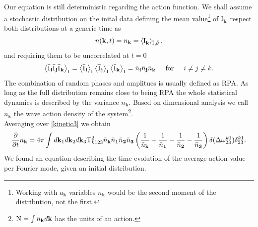 Our equation is still deterministic regarding the action function. We shall assume a stochastic distribution on the inital data defining 
the mean value\footnote{Working with $a_\mathbf{k}$ variables $n_\mathbf{k}$ would be the second moment of the distribution, not the first.}
of $\mathrm{I}^{}_\mathbf{k}$ respect both distributions at a generic time as 
\begin{equation}
    n(\mathbf{k},t) = n_\mathbf{k} = \left\langle \mathrm{I}^{}_\mathbf{k} \right\rangle_{\bar{\mathrm{I}^{}}, \bar{\theta}^{}},
    \label{wavdef}
\end{equation}     
and requiring them to be uncorrelated at $t=0$ \\
\begin{equation}
    \left\langle \bar{\mathrm{I}^{}}_\mathbf{i} \bar{\mathrm{I}^{}}_\mathbf{j} \bar{\mathrm{I}^{}}_\mathbf{k}\right\rangle_{\bar{\mathrm{I}^{}}} = 
    \left\langle\bar{\mathrm{I}^{}}_\mathbf{i} \right\rangle_{\bar{\mathrm{I}^{}}} \left\langle \bar{\mathrm{I}^{}}_\mathbf{j} \right\rangle_{\bar{\mathrm{I}^{}}} \left\langle \bar{\mathrm{I}^{}}_\mathbf{k} \right\rangle_{\bar{\mathrm{I}^{}}}
    = \bar{n}_\mathbf{i} \bar{n}_\mathbf{j} \bar{n}_\mathbf{k} \hspace{5mm} \text{for} \hspace{5mm} i\neq j\neq k.
\end{equation}
The combination of random phases and amplitues is usually defined as RPA. As long as the full distribution remains close to being RPA the whole statistical dynamics
is described by the variance $n_\mathbf{k}$. Based on dimensional analysis we call 
$n_\mathbf{k}$ the wave action density of the system\footnote{$\mathrm{N} = \int n_\mathbf{k} d\mathbf{k}$ has the units of an action.}.\\
Averaging over \eqref{kinetic3} we obtain
\begin{equation}
    \frac{\partial}{\partial t} n_\mathbf{k} = 4 \pi\int d\mathbf{k}_1 d\mathbf{k}_2 d\mathbf{k}_3 \\
    \mathrm{T}^2_{k123}\bar{n}_\mathbf{k}\bar{n}_\mathbf{1}\bar{n}_\mathbf{2}\bar{n}_\mathbf{3}
    \left(\frac{1}{\bar{n}_\mathbf{k}} + \frac{1}{\bar{n}_\mathbf{1}} - \frac{1}{\bar{n}_\mathbf{2}}- \frac{1}{\bar{n}_\mathbf{3}}  \right)
    \delta(\Delta{\omega}^{k1}_{23})\delta^{k1}_{23}.
    \label{kinetic4}
\end{equation}
We found an equation describing the time evolution of the average action value per Fourier mode, given an initial distribution.\\
